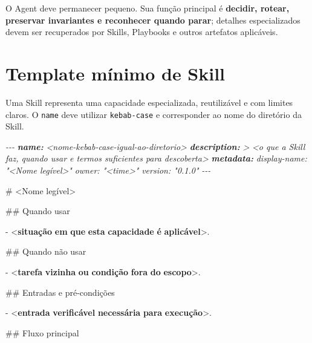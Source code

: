 \documentclass[
  10pt,
  a4paper,
  oneside]{book}
\newenvironment{Shaded}{}{}
\newcommand{\AnnotationTok}[1]{\textcolor[rgb]{0.38,0.63,0.69}{\textbf{\textit{#1}}}}
\newcommand{\CommentTok}[1]{\textcolor[rgb]{0.38,0.63,0.69}{\textit{#1}}}
\newcommand{\DataTypeTok}[1]{\textcolor[rgb]{0.56,0.13,0.00}{#1}}
\newcommand{\ErrorTok}[1]{\textcolor[rgb]{1.00,0.00,0.00}{\textbf{#1}}}
\newcommand{\FunctionTok}[1]{\textcolor[rgb]{0.02,0.16,0.49}{#1}}
\newcommand{\KeywordTok}[1]{\textcolor[rgb]{0.00,0.44,0.13}{\textbf{#1}}}
\newcommand{\NormalTok}[1]{#1}
\newcommand{\SpecialStringTok}[1]{\textcolor[rgb]{0.73,0.40,0.53}{#1}}
\renewenvironment{Shaded}{\begin{snugshade}}{\end{snugshade}}%
\begin{document}
O Agent deve permanecer pequeno. Sua função principal é \textbf{decidir,
rotear, preservar invariantes e reconhecer quando parar}; detalhes
especializados devem ser recuperados por Skills, Playbooks e outros
artefatos aplicáveis.

\hypertarget{template-muxednimo-de-skill}{%
\section{Template mínimo de Skill}\label{template-muxednimo-de-skill}}

Uma Skill representa uma capacidade especializada, reutilizável e com
limites claros. O \texttt{name} deve utilizar \texttt{kebab-case} e
corresponder ao nome do diretório da Skill.

\begin{Shaded}
\begin{Highlighting}[]
\CommentTok{{-}{-}{-}}
\AnnotationTok{name:}\CommentTok{ \textless{}nome{-}kebab{-}case{-}igual{-}ao{-}diretorio\textgreater{}}
\AnnotationTok{description:}\CommentTok{ \textgreater{}}
\CommentTok{  \textless{}o que a Skill faz, quando usar e termos suficientes para descoberta\textgreater{}}
\AnnotationTok{metadata:}
\CommentTok{  display{-}name: "\textless{}Nome legível\textgreater{}"}
\CommentTok{  owner: "\textless{}time\textgreater{}"}
\CommentTok{  version: "0.1.0"}
\CommentTok{{-}{-}{-}}

\FunctionTok{\# \textless{}Nome legível\textgreater{}}

\FunctionTok{\#\# Quando usar}

\SpecialStringTok{{-} }\DataTypeTok{\textless{}}\KeywordTok{situação} \ErrorTok{em} \ErrorTok{que} \ErrorTok{esta} \ErrorTok{capacidade} \ErrorTok{é} \ErrorTok{aplicável}\DataTypeTok{\textgreater{}}\NormalTok{.}

\FunctionTok{\#\# Quando não usar}

\SpecialStringTok{{-} }\DataTypeTok{\textless{}}\KeywordTok{tarefa} \ErrorTok{vizinha} \ErrorTok{ou} \ErrorTok{condição} \ErrorTok{fora} \ErrorTok{do} \ErrorTok{escopo}\DataTypeTok{\textgreater{}}\NormalTok{.}

\FunctionTok{\#\# Entradas e pré{-}condições}

\SpecialStringTok{{-} }\DataTypeTok{\textless{}}\KeywordTok{entrada} \ErrorTok{verificável} \ErrorTok{necessária} \ErrorTok{para} \ErrorTok{execução}\DataTypeTok{\textgreater{}}\NormalTok{.}

\FunctionTok{\#\# Fluxo principal}


\end{Highlighting}
\end{Shaded}
\end{document}
